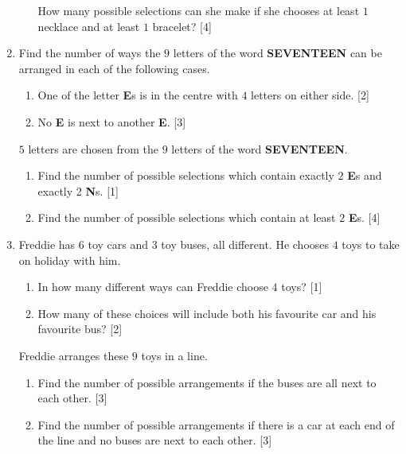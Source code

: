 \begin{enumerate}
\begin{enumerate}[label=(\roman*)]
How many possible selections can she make if she chooses at least $1$ necklace and at least $1$
bracelet?  \hfill [4]
\end{enumerate}



\item Find the number of ways the $9$ letters of the word \textbf{SEVENTEEN} can be arranged in each of the following cases.

\begin{enumerate}[label=(\roman*)]
	\item One of the letter \textbf{E}s is in the centre with $4$ letters on either side. \hfill[2]
	\item No \textbf{E} is next to another \textbf{E}. \hfill[3]
\end{enumerate}
$5$ letters are chosen from the $9$ letters of the word \textbf{SEVENTEEN}.
\begin{enumerate}[resume,label=(\roman*)]
	\item Find the number of possible selections which contain exactly $2$ \textbf{E}s and exactly 2 \textbf{N}s. \hfill[1]
	\item Find the number of possible selections which contain at least $2$ \textbf{E}s. \hfill[4]
\end{enumerate}


\item  Freddie has $6$ toy cars and $3$ toy buses, all different. He chooses $4$ toys to take on holiday with him.

\begin{enumerate}[label=(\roman*)]
	\item In how many different ways can Freddie choose $4$ toys? \hfill[1]
	\item How many of these choices will include both his favourite car and his favourite bus? \hfill[2]
\end{enumerate}

Freddie arranges these $9$ toys in a line.

\begin{enumerate}[resume,label=(\roman*)]
	\item Find the number of possible arrangements if the buses are all next to each other. \hfill[3]
	\item  Find the number of possible arrangements if there is a car at each end of the line and no buses are next to each other. \hfill[3]
\end{enumerate}



\end{enumerate}
